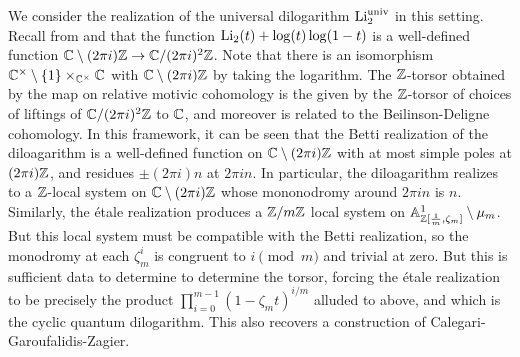 We consider the realization of the universal dilogarithm $\mathrm{Li}_{2}^{\mathrm{univ}}$ in this setting. Recall from  and  that the function $\mathrm{Li}_{2}(t)+\log(t)\log(1-t)$ is a well-defined function $\mathbb{C}\setminus(2\pi i)\mathbb{Z}\to\mathbb{C}/(2\pi i)^{2}\mathbb{Z}$. Note that there is an isomorphism $\mathbb{C}^{\times}\setminus\{1\}\times_{\mathbb{C}^{\times}}\mathbb{C}$ with $\mathbb{C}\setminus(2\pi i)\mathbb{Z}$ by taking the logarithm. The $\mathbb{Z}$-torsor obtained by the map on relative motivic cohomology is the given by the $\mathbb{Z}$-torsor of choices of liftings of $\mathbb{C}/(2\pi i)^{2}\mathbb{Z}$ to $\mathbb{C}$, and moreover is related to the Beilinson-Deligne cohomology. In this framework, it can be seen that the Betti realization of the diloagarithm is a well-defined function on $\mathbb{C}\setminus(2\pi i)\mathbb{Z}$ with at most simple poles at $(2\pi i)\mathbb{Z}$, and residues $\pm(2\pi i)n$ at $2\pi i n$. In particular, the diloagarithm realizes to a $\mathbb{Z}$-local system on $\mathbb{C}\setminus(2\pi i)\mathbb{Z}$ whose mononodromy around $2\pi i n$ is $n$. Similarly, the \'{e}tale realization produces a $\mathbb{Z}/m\mathbb{Z}$ local system on $\mathbb{A}^{1}_{\mathbb{Z}[\frac{1}{m},\zeta_{m}]}\setminus\mu_{m}$. But this local system must be compatible with the Betti realization, so the monodromy at each $\zeta_{m}^{i}$ is congruent to $i\pmod{m}$ and trivial at zero. But this is sufficient data to determine to determine the torsor, forcing the \'{e}tale realization to be precisely the product $\prod_{i=0}^{m-1}(1-\zeta_{m}t)^{i/m}$ alluded to above, and which is the cyclic quantum dilogarithm. This also recovers a construction of Calegari-Garoufalidis-Zagier. 